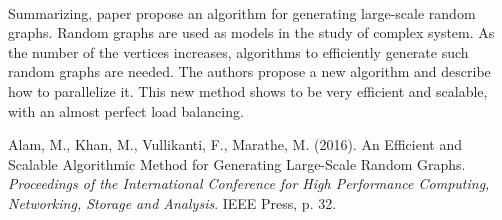 \documentclass[a4paper,11pt]{article}
\theoremstyle{definition}
\theoremstyle{plain}
\theoremstyle{remark}
\begin{document}
\paragraph*{} Summarizing, paper \cite{alam:random} propose an algorithm for generating large-scale random graphs. Random graphs are used as models in the study of complex system. As the number of the vertices increases, algorithms to efficiently generate such random graphs are needed.
The authors propose a new algorithm and describe how to parallelize it. This new method shows to be very efficient and scalable, with an almost perfect load balancing.  

\begin{thebibliography}{99}

 Alam, M., Khan, M., Vullikanti, F., Marathe, M. (2016). An Efficient and Scalable Algorithmic Method for Generating Large-Scale Random Graphs. \emph{Proceedings of the International Conference for High Performance Computing, Networking, Storage and Analysis}. IEEE Press, p. 32.

\end{thebibliography}
\end{document}
